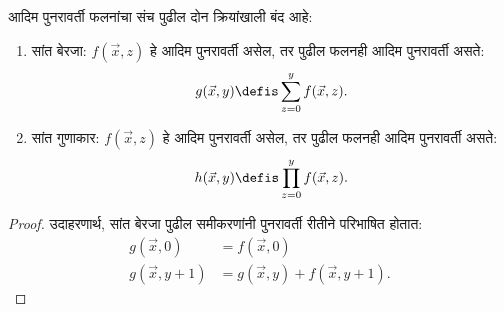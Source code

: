 \documentclass[../../../include/open-logic-section]{subfiles}
\begin{document}
\begin{prop}
आदिम पुनरावर्ती फलनांचा संच पुढील दोन क्रियांखाली बंद आहे:
\begin{enumerate}
\item सांत बेरजा: $f(\vec x, z)$ हे आदिम पुनरावर्ती असेल, तर पुढील
फलनही आदिम पुनरावर्ती असते:
\[
g(\vec x, y) \defis \sum_{z = 0}^y f(\vec x, z).
\]
\item सांत गुणाकार: $f(\vec x, z)$ हे आदिम पुनरावर्ती असेल, तर पुढील
फलनही आदिम पुनरावर्ती असते:
\[
h(\vec x, y) \defis \prod_{z = 0}^y f(\vec x, z).
\]
\end{enumerate}
\end{prop}

\begin{proof}
उदाहरणार्थ, सांत बेरजा पुढील समीकरणांनी पुनरावर्ती रीतीने परिभाषित होतात:
\begin{align*}
  g(\vec x, 0) & = f(\vec x, 0)\\
  g(\vec x, y+1) & = g(\vec x, y) + f(\vec x, y+1).
\end{align*}
\end{proof}
\end{document}
